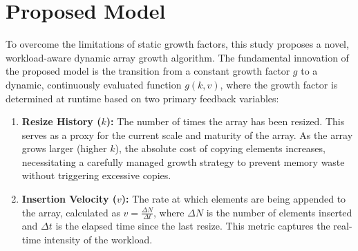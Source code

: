 \section{Proposed Model}
To overcome the limitations of static growth factors, this study proposes a 
novel, workload-aware dynamic array growth algorithm. The fundamental innovation 
of the proposed model is the transition from a constant growth factor $g$ to a 
dynamic, continuously evaluated function $g(k, v)$, where the growth factor is 
determined at runtime based on two primary feedback variables:
\begin{enumerate}
    \item \textbf{Resize History ($k$):} The number of times the array has been 
    resized. This serves as a proxy for the current scale and maturity of the 
    array. As the array grows larger (higher $k$), the absolute cost of copying 
    elements increases, necessitating a carefully managed growth strategy to 
    prevent memory waste without triggering excessive copies.
    \item \textbf{Insertion Velocity ($v$):} The rate at which elements are being 
    appended to the array, calculated as $v = \frac{\Delta N}{\Delta t}$, where 
    $\Delta N$ is the number of elements inserted and $\Delta t$ is the elapsed 
    time since the last resize. This metric captures the real-time intensity of 
    the workload.
\end{enumerate}

